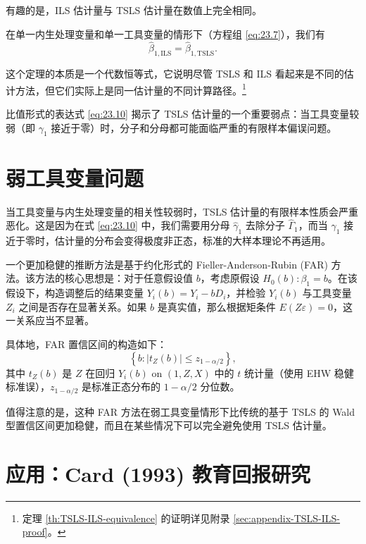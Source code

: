 有趣的是，ILS 估计量与 TSLS 估计量在数值上完全相同。

\begin{Theorem}\label{th:TSLS-ILS-equivalence}
在单一内生处理变量和单一工具变量的情形下（方程组 \cref{eq:23.7}），我们有
\begin{equation}
\hat{\beta}_{1,\mathrm{ILS}} = \hat{\beta}_{1,\mathrm{TSLS}}. \label{eq:23.11}
\end{equation}
\end{Theorem}

这个定理的本质是一个代数恒等式，它说明尽管 TSLS 和 ILS 看起来是不同的估计方法，但它们实际上是同一估计量的不同计算路径。\footnote{定理 \cref{th:TSLS-ILS-equivalence} 的证明详见附录 \cref{sec:appendix-TSLS-ILS-proof}。}

比值形式的表达式 \cref{eq:23.10} 揭示了 TSLS 估计量的一个重要弱点：当工具变量较弱（即 $\gamma_1$ 接近于零）时，分子和分母都可能面临严重的有限样本偏误问题。

\section{弱工具变量问题}\label{sec:weak-IV}

当工具变量与内生处理变量的相关性较弱时，TSLS 估计量的有限样本性质会严重恶化。这是因为在式 \cref{eq:23.10} 中，我们需要用分母 $\hat{\gamma}_1$ 去除分子 $\hat{\Gamma}_1$，而当 $\gamma_1$ 接近于零时，估计量的分布会变得极度非正态，标准的大样本理论不再适用。

一个更加稳健的推断方法是基于约化形式的 Fieller-Anderson-Rubin (FAR) 方法。该方法的核心思想是：对于任意假设值 $b$，考虑原假设 $H_0(b): \beta_1 = b$。在该假设下，构造调整后的结果变量 $Y_i(b) = Y_i - b D_i$，并检验 $Y_i(b)$ 与工具变量 $Z_i$ 之间是否存在显著关系。如果 $b$ 是真实值，那么根据矩条件 $E(Z\varepsilon)=0$，这一关系应当不显著。

具体地，FAR 置信区间的构造如下：
\begin{equation}
\left\{b: |t_Z(b)| \leq z_{1-\alpha/2}\right\}, \label{eq:23.12}
\end{equation}
其中 $t_Z(b)$ 是 $Z$ 在回归 $Y_i(b)$ on $(1, Z, X)$ 中的 $t$ 统计量（使用 EHW 稳健标准误），$z_{1-\alpha/2}$ 是标准正态分布的 $1-\alpha/2$ 分位数。

值得注意的是，这种 FAR 方法在弱工具变量情形下比传统的基于 TSLS 的 Wald 型置信区间更加稳健，而且在某些情况下可以完全避免使用 TSLS 估计量。

\section{应用：Card (1993) 教育回报研究}\label{sec:TSLS-application}

